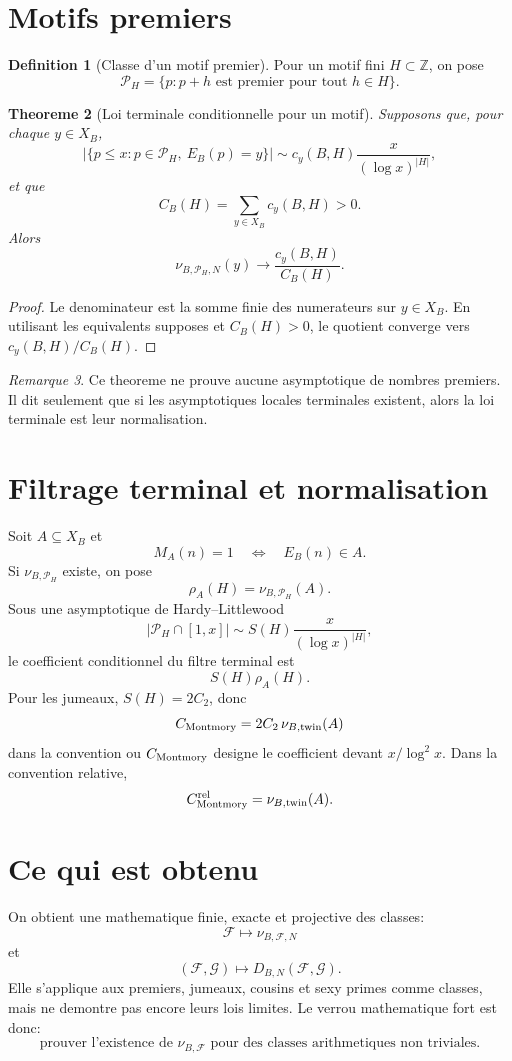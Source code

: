 \documentclass[11pt]{article}
\theoremstyle{plain}
\newtheorem{theorem}{Theoreme}[section]
\theoremstyle{definition}
\newtheorem{definition}[theorem]{Definition}
\theoremstyle{remark}
\newtheorem{remark}[theorem]{Remarque}
\newcommand{\1}{\mathbf 1}
\newcommand{\F}{\mathcal F}
\newcommand{\G}{\mathcal G}
\begin{document}
\section{Motifs premiers}

\begin{definition}[Classe d'un motif premier]
Pour un motif fini \(H\subset\mathbb Z\), on pose
\[
\mathcal P_H=\{p:p+h\text{ est premier pour tout }h\in H\}.
\]
\end{definition}

\begin{theorem}[Loi terminale conditionnelle pour un motif]
Supposons que, pour chaque \(y\in X_B\),
\[
|\{p\le x:p\in\mathcal P_H,\ E_B(p)=y\}|
\sim
c_y(B,H)\frac{x}{(\log x)^{|H|}},
\]
et que
\[
C_B(H)=\sum_{y\in X_B}c_y(B,H)>0.
\]
Alors
\[
\nu_{B,\mathcal P_H,N}(y)\longrightarrow
\frac{c_y(B,H)}{C_B(H)}.
\]
\end{theorem}

\begin{proof}
Le denominateur est la somme finie des numerateurs sur \(y\in X_B\). En
utilisant les equivalents supposes et \(C_B(H)>0\), le quotient converge vers
\(c_y(B,H)/C_B(H)\).
\end{proof}

\begin{remark}
Ce theoreme ne prouve aucune asymptotique de nombres premiers. Il dit seulement
que si les asymptotiques locales terminales existent, alors la loi terminale est
leur normalisation.
\end{remark}

\section{Filtrage terminal et normalisation}

Soit \(A\subseteq X_B\) et
\[
M_A(n)=1\quad\Longleftrightarrow\quad E_B(n)\in A.
\]
Si \(\nu_{B,\mathcal P_H}\) existe, on pose
\[
\rho_A(H)=\nu_{B,\mathcal P_H}(A).
\]
Sous une asymptotique de Hardy--Littlewood
\[
|\mathcal P_H\cap[1,x]|
\sim
S(H)\frac{x}{(\log x)^{|H|}},
\]
le coefficient conditionnel du filtre terminal est
\[
S(H)\rho_A(H).
\]
Pour les jumeaux, \(S(H)=2C_2\), donc
\[
C_{\rm Montmory}=2C_2\,\nu_{B,\rm twin}(A)
\]
dans la convention ou \(C_{\rm Montmory}\) designe le coefficient devant
\(x/\log^2x\). Dans la convention relative,
\[
C_{\rm Montmory}^{\rm rel}=\nu_{B,\rm twin}(A).
\]

\section{Ce qui est obtenu}

On obtient une mathematique finie, exacte et projective des classes:
\[
\boxed{\F\longmapsto \nu_{B,\F,N}}
\]
et
\[
\boxed{(\F,\G)\longmapsto D_{B,N}(\F,\G).}
\]
Elle s'applique aux premiers, jumeaux, cousins et sexy primes comme classes,
mais ne demontre pas encore leurs lois limites. Le verrou mathematique fort est
donc:
\[
\boxed{\text{prouver l'existence de }\nu_{B,\F}
\text{ pour des classes arithmetiques non triviales}.}
\]
\end{document}
